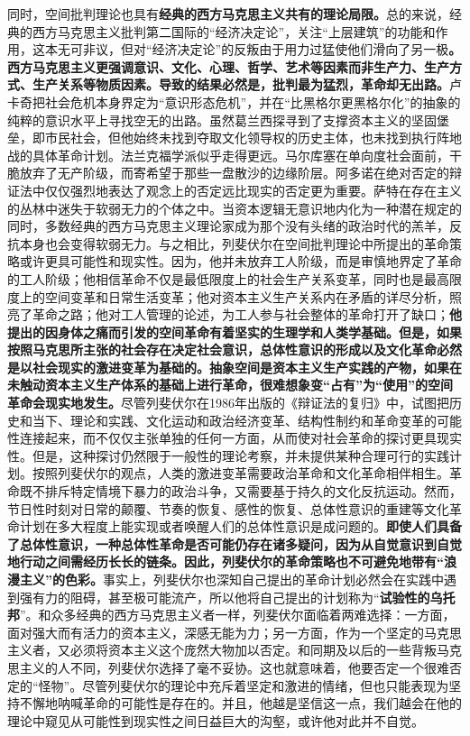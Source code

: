 \documentclass[UTF8, fontset = sourcesans, a4paper, oneside, zihao =
-4, scheme=chinese, no-math, space=true]{ctexbook}
\begin{document}
同时，空间批判理论也具有\textbf{经典的西方马克思主义共有的理论局限。}总的来说，经典的西方马克思主义批判第二国际的``经济决定论''，关注``上层建筑''的功能和作用，这本无可非议，但对``经济决定论''的反叛由于用力过猛使他们滑向了另一极\textbf{。西方马克思主义更强调意识、文化、心理、哲学、艺术等因素而非生产力、生产方式、生产关系等物质因素。导致的结果必然是，批判最为猛烈，革命却无出路。}卢卡奇把社会危机本身界定为``意识形态危机''，并在``比黑格尔更黑格尔化''的抽象的纯粹的意识水平上寻找空无的出路。虽然葛兰西探寻到了支撑资本主义的坚固堡垒，即市民社会，但他始终未找到夺取文化领导权的历史主体，也未找到执行阵地战的具体革命计划。法兰克福学派似乎走得更远。马尔库塞在单向度社会面前，干脆放弃了无产阶级，而寄希望于那些一盘散沙的边缘阶层。阿多诺在绝对否定的辩证法中仅仅强烈地表达了观念上的否定远比现实的否定更为重要。萨特在存在主义的丛林中迷失于软弱无力的个体之中。当资本逻辑无意识地内化为一种潜在规定的同时，多数经典的西方马克思主义理论家成为那个没有头绪的政治时代的羔羊，反抗本身也会变得软弱无力。与之相比，列斐伏尔在空间批判理论中所提出的革命策略或许更具可能性和现实性。因为，他并未放弃工人阶级，而是审慎地界定了革命的工人阶级；他相信革命不仅是最低限度上的社会生产关系变革，同时也是最高限度上的空间变革和日常生活变革；他对资本主义生产关系内在矛盾的详尽分析，照亮了革命之路；他对工人管理的论述，为工人参与社会整体的革命打开了缺口；\textbf{他提出的因身体之痛而引发的空间革命有着坚实的生理学和人类学基础。但是，如果按照马克思所主张的社会存在决定社会意识，总体性意识的形成以及文化革命必然是以社会现实的激进变革为基础的。抽象空间是资本主义生产实践的产物，如果在未触动资本主义生产体系的基础上进行革命，很难想象变``占有''为``使用''的空间革命会现实地发生。}尽管列斐伏尔在1986年出版的《辩证法的复归》中，试图把历史和当下、理论和实践、文化运动和政治经济变革、结构性制约和革命变革的可能性连接起来，而不仅仅主张单独的任何一方面，从而使对社会革命的探讨更具现实性。但是，这种探讨仍然限于一般性的理论考察，并未提供某种合理可行的实践计划。按照列斐伏尔的观点，人类的激进变革需要政治革命和文化革命相伴相生。革命既不排斥特定情境下暴力的政治斗争，又需要基于持久的文化反抗运动。然而，节日性时刻对日常的颠覆、节奏的恢复、感性的恢复、总体性意识的重建等文化革命计划在多大程度上能实现或者唤醒人们的总体性意识是成问题的。\textbf{即使人们具备了总体性意识，一种总体性革命是否可能仍存在诸多疑问，因为从自觉意识到自觉地行动之间需经历长长的链条。因此，列斐伏尔的革命策略也不可避免地带有``浪漫主义''的色彩。}事实上，列斐伏尔也深知自己提出的革命计划必然会在实践中遇到强有力的阻碍，甚至极可能流产，所以他将自己提出的计划称为``\textbf{试验性的乌托邦}''。和众多经典的西方马克思主义者一样，列斐伏尔面临着两难选择：一方面，面对强大而有活力的资本主义，深感无能为力；另一方面，作为一个坚定的马克思主义者，又必须将资本主义这个庞然大物加以否定。和同期及以后的一些背叛马克思主义的人不同，列斐伏尔选择了毫不妥协。这也就意味着，他要否定一个很难否定的``怪物''。尽管列斐伏尔的理论中充斥着坚定和激进的情绪，但也只能表现为坚持不懈地呐喊革命的可能性是存在的。并且，他越是坚信这一点，我们越会在他的理论中窥见从可能性到现实性之间日益巨大的沟壑，或许他对此并不自觉。
\end{document}

